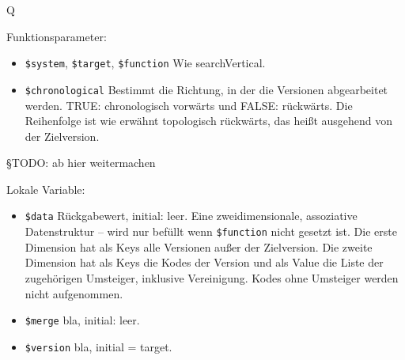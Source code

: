 
Q


Funktionsparameter:

\begin{itemize}
\item \texttt{\$system}, \texttt{\$target}, \texttt{\$function}  \newline Wie searchVertical. 
\item \texttt{\$chronological}
\newline Bestimmt die Richtung, in der die Versionen abgearbeitet werden. TRUE: chronologisch vorwärts und FALSE: rückwärts. Die Reihenfolge ist wie erwähnt topologisch rückwärts, das heißt ausgehend von der Zielversion. 
\end{itemize}

{\color{blue} §TODO: ab hier weitermachen}

Lokale Variable:

\begin{itemize}
\item \texttt{\$data} \hspace{2em} Rückgabewert, initial: leer.
\newline Eine zweidimensionale, assoziative Datenstruktur -- wird nur befüllt wenn \texttt{\$function} nicht gesetzt ist. Die erste Dimension hat als Keys alle Versionen außer der Zielversion. Die zweite Dimension hat als Keys die Kodes der Version und als Value die Liste der zugehörigen Umsteiger, inklusive Vereinigung. Kodes ohne Umsteiger werden nicht aufgenommen.
\item \texttt{\$merge} \newline bla, initial: leer.
\item \texttt{\$version} \newline bla, initial = target.
\end{itemize}



